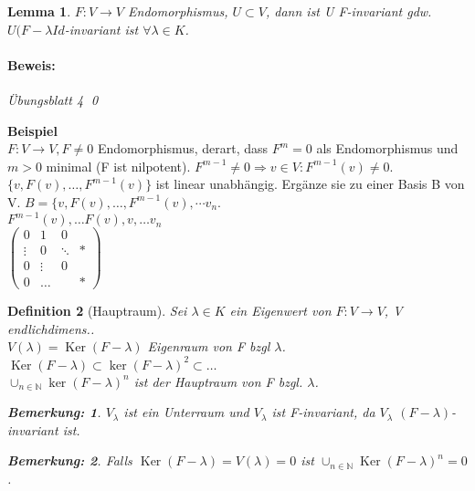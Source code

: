 \documentclass{report}
\newcommand{\lb}{\lambda}
\newcommand{\N}{\mathbb{N}}
\DeclareMathOperator{\Ker}{Ker}
\theoremstyle{customrem}
\newtheorem*{bemerkung}{Bemerkung\textnormal:}
\theoremstyle{customdef}
\newtheorem{definition}{Definition}[chapter]
\newtheorem{lemma}[definition]{Lemma}
\renewenvironment{proof}{\paragraph{Beweis: }}{\qed}
\theoremstyle{customenv}
\begin{document}
\begin{lemma}
  \(F : V \to V\) Endomorphismus, \(U \subset V\), dann ist U F-invariant gdw.
  \(U (F - \lb Id\)-invariant ist \(\forall \lb \in K\).
  \begin{proof}
    \"Ubungsblatt 4
  \end{proof}
\end{lemma}

\textbf{Beispiel}\\
\(F : V \to V, F \neq 0\) Endomorphismus, derart, dass \(F^m = 0\) als
Endomorphismus und \(m > 0\) minimal (F ist nilpotent). \(F^{m-1} \neq 0
\Rightarrow v \in V : F^{m-1}(v) \neq 0\). \(\{v, F(v), \dots, F^{m-1}(v)\}\)
ist linear unabh\"angig. Erg\"anze sie zu einer Basis B von V.
\(B = \{v, F(v), \dots, F^{m-1}(v), \dotsm v_n\).\\
\(F^{m-1}(v), \dots F(v), v, \dots v_n\)\\
\(
  \begin{pmatrix}
    0      & 1      & 0      & \\
    \vdots & 0      & \ddots & *\\
    0      & \vdots & 0      & \\
    0      & \dots  &        & *
  \end{pmatrix}
\)

\begin{definition}[Hauptraum]
  Sei \(\lb \in K\) ein Eigenwert von \(F : V \to V\), V endlichdimens..\\
  \(V(\lb) = \Ker(F - \lb)\) Eigenraum von F bzgl \(\lb\).\\
  \(\Ker(F - \lb) \subset \ker(F - \lb)^2 \subset \dots\)\\
  \(\cup_{n \in \N} \ker(F - \lb)^n\) ist der Hauptraum von F bzgl. \(\lb\).
  \begin{bemerkung}
    \(V_\lb\) ist ein Unterraum und \(V_\lb\) ist F-invariant,
    da \(V_\lb\) \((F - \lb)\)-invariant ist.
  \end{bemerkung}
  \begin{bemerkung}
    Falls \(\Ker(F - \lb) = V(\lb) = 0\) ist
    \(\cup_{n \in \N}\Ker(F - \lb)^n = 0\).
  \end{bemerkung}
\end{definition}
\end{document}
